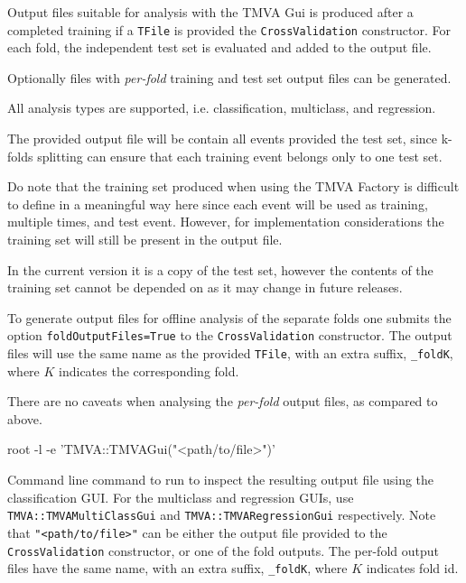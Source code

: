 Output files suitable for analysis with the TMVA Gui is produced after a completed training if a \texttt{TFile} is provided the \texttt{CrossValidation} constructor. For each fold, the independent test set is evaluated and added to the output file.

Optionally files with \emph{per-fold} training and test set output files can be generated. 

All analysis types are supported, i.e. classification, multiclass, and regression.

The provided output file will be contain all events provided the test set, since k-folds splitting can ensure that each training event belongs only to one test set.

Do note that the training set produced when using the TMVA Factory is difficult to define in a meaningful way here since each event will be used as training, multiple times, and test event. However, for implementation considerations the training set will still be present in the output file. 

In the current version it is a copy of the test set, however the contents of the training set cannot be depended on as it may change in future releases.

To generate output files for offline analysis of the separate folds one submits the option \texttt{foldOutputFiles=True} to the \texttt{CrossValidation} constructor. The output files will use the same name as the provided \texttt{TFile}, with an extra suffix, \texttt{\_foldK}, where $K$ indicates the corresponding fold.

There are no caveats when analysing the \emph{per-fold} output files, as compared to above.

\begin{codeexample}
\begin{tmvacode}
root -l -e 'TMVA::TMVAGui("<path/to/file>")'
\end{tmvacode}
\caption[.]{\codeexampleCaptionSize Command line command to run to inspect the resulting output file using the classification GUI.
For the multiclass and regression GUIs, use \texttt{TMVA::TMVAMultiClassGui} and \texttt{TMVA::TMVARegressionGui} respectively. Note that \texttt{"<path/to/file>"} can be either the output file provided to the \texttt{CrossValidation} constructor, or one of the fold outputs.
The per-fold output files have the same name, with an extra suffix, \texttt{\_foldK}, where $K$ indicates fold id.}
\label{code:cv-gui}
\end{codeexample}

